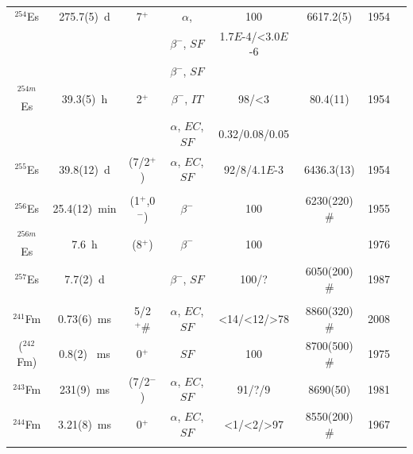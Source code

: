 \begin{center}
\begin{longtable}{c|ccccccl}
$^{254}$Es	&275.7(5)~d		&  7$^+$	&$\alpha$, 			&100			& 6617.2(5)		&1954	&{\tiny\cite{Choppin1954,Fields1954,Harvey1955,Schuhman1958,Phillips1963,Gregorich1987a}}\\
			&				& 			&$\beta^-$, $SF$	&1.7$E$-4/<3.0$E$-6& 			&		&{\tiny\cite{Metta1965,McHarris1966,Fields1967,Ahmad1975,Goodman1975,Moody1993}}\\
			&				& 			&$\beta^-$, $SF$	&			    & 				&		&{\tiny\cite{Ahmad2008,Kondev2009,Kratz2013,Devaraja2019,Nothelfer2022}}\\
$^{254m}$Es &39.3(5)~h		&  2$^+$	&$\beta^-$, $IT$	&98/<3    		&  80.4(11) 	&1954	&{\tiny\cite{Jones1956,Unik1962,Ahmad1973,Kratz2013,Devaraja2019}}\\
			&				& 			&$\alpha$, $EC$, $SF$&0.32/0.08/0.05&   			&		&					\\
$^{255}$Es 	&39.8(12)~d		&  (7/2$^+$)&$\alpha$, $EC$, $SF$ 	&92/8/4.1$E$-3	& 6436.3(13)&1954	&{\tiny\cite{Choppin1954,CombChem1966,Fields1967,Britt1984,Gregorich1987a,Kratz2013}}\\
			& 				&  			&					&			    & 				&		&{\tiny\cite{Nothelfer2022}}\\
$^{256}$Es 	&25.4(12)~min	& (1$^+$,0$^-$)&$\beta^-$		&100			& 6230(220)$\#$	&1955	&{\tiny\cite{Choppin1955,Lougheed1976,Britt1980,Lougheed1981,Britt1984,Ghys2015}}\\
$^{256m}$Es 	&7.6~h		&  (8$^+$)	&$\beta^-$			&100			&				&1976 	&{\tiny\cite{Lougheed1976,Hall1989,Kratz2013,Devaraja2019}}\\
$^{257}$Es 	&7.7(2)~d		&  			&$\beta^-$, $SF$	& 100/?		    & 6050(200)$\#$	&1987	&{\tiny\cite{Popov1987}}\\
\hline\\
$^{241}$Fm	& 0.73(6)~ms	&5/2$^+\#$	&$\alpha$, $EC$, $SF$&<14/<12/>78	& 8860(320)$\#$	&2008	&{\tiny\cite{Khuyagbaatar2008}}\\
($^{242}$Fm)& 0.8(2) ~ms	&  0$^+$	&$SF$				&100			& 8700(500)$\#$	&1975	&{\tiny\cite{TerAkopian1975,Holden2000,Khuyagbaatar2008}}\\
$^{243}$Fm	& 231(9)~ms		&(7/2$^-$)	&$\alpha$, $EC$, $SF$	&91/?/9		& 8690(50)		&1981	&{\tiny\cite{Muenzenberg1981a,Gaeggeler1984,Khuyagbaatar2008,Khuyagbaatar2020a}}\\
$^{244}$Fm	& 3.21(8)~ms		&  0$^+$		&$\alpha$, $EC$, $SF$	&<1/<2/>97	& 8550(200)$\#$	&1967	&{\tiny\cite{Nurmia1967,Oganessian1975,Gaeggeler1979,Iljinov1989,Holden2000,Khuyagbaatar2008}}\\
			& 				&  			&					&			& 				&		&{\tiny\cite{Svirikhin2013,Hessberger2017,Khuyagbaatar2020a,Khuyagbaatar2021,Mukhin2024}}\\

\end{longtable}
\end{center}
